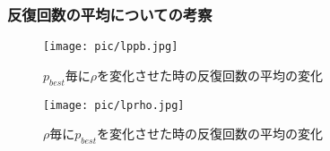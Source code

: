 \documentclass[a4j]{jsarticle}
\begin{document}
\subsubsection{反復回数の平均についての考察}
\begin{figure}[htb]
 \begin{minipage}{0.5\hsize}
  \begin{center}
   \texttt{[image: pic/lppb.jpg]}
  \end{center}
  \caption{$p_{best}$毎に$\rho$を変化させた時の反復回数の平均の変化}
  \label{lppb}
 \end{minipage}
 \begin{minipage}{0.5\hsize}
  \begin{center}
   \texttt{[image: pic/lprho.jpg]}
  \end{center}
  \caption{$\rho$毎に$p_{best}$を変化させた時の反復回数の平均の変化}
  \label{lprho}
 \end{minipage}
\end{figure}
\end{document}
